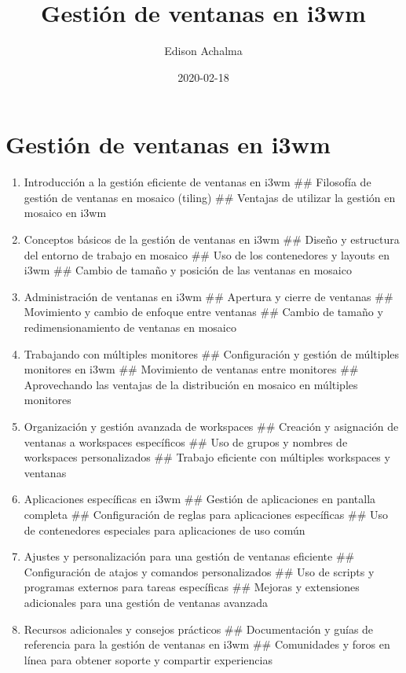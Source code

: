 \documentclass[
  jou,
  floatsintext,
  longtable,
  a4paper,
  nolmodern,
  notxfonts,
  notimes,
  12pt,
  colorlinks=true,linkcolor=blue,citecolor=blue,urlcolor=blue]{apa7}
\title{Gestión de ventanas en i3wm}
\author{Edison Achalma}
\affiliation{
{Escuela Profesional de Economía, Universidad Nacional de San Cristóbal
de Huamanga}}
\date{2020-02-18}
\begin{document}
\maketitle


\hypertarget{toc}{}
\tableofcontents
\newpage
\section[Introduction]{Gestión de ventanas en i3wm}

\setcounter{secnumdepth}{3}

\setlength\LTleft{0pt}




\begin{enumerate}
\def\labelenumi{\arabic{enumi}.}
\item
  Introducción a la gestión eficiente de ventanas en i3wm \#\# Filosofía
  de gestión de ventanas en mosaico (tiling) \#\# Ventajas de utilizar
  la gestión en mosaico en i3wm
\item
  Conceptos básicos de la gestión de ventanas en i3wm \#\# Diseño y
  estructura del entorno de trabajo en mosaico \#\# Uso de los
  contenedores y layouts en i3wm \#\# Cambio de tamaño y posición de las
  ventanas en mosaico
\item
  Administración de ventanas en i3wm \#\# Apertura y cierre de ventanas
  \#\# Movimiento y cambio de enfoque entre ventanas \#\# Cambio de
  tamaño y redimensionamiento de ventanas en mosaico
\item
  Trabajando con múltiples monitores \#\# Configuración y gestión de
  múltiples monitores en i3wm \#\# Movimiento de ventanas entre
  monitores \#\# Aprovechando las ventajas de la distribución en mosaico
  en múltiples monitores
\item
  Organización y gestión avanzada de workspaces \#\# Creación y
  asignación de ventanas a workspaces específicos \#\# Uso de grupos y
  nombres de workspaces personalizados \#\# Trabajo eficiente con
  múltiples workspaces y ventanas
\item
  Aplicaciones específicas en i3wm \#\# Gestión de aplicaciones en
  pantalla completa \#\# Configuración de reglas para aplicaciones
  específicas \#\# Uso de contenedores especiales para aplicaciones de
  uso común
\item
  Ajustes y personalización para una gestión de ventanas eficiente \#\#
  Configuración de atajos y comandos personalizados \#\# Uso de scripts
  y programas externos para tareas específicas \#\# Mejoras y
  extensiones adicionales para una gestión de ventanas avanzada
\item
  Recursos adicionales y consejos prácticos \#\# Documentación y guías
  de referencia para la gestión de ventanas en i3wm \#\# Comunidades y
  foros en línea para obtener soporte y compartir experiencias
\end{enumerate}
\end{document}
